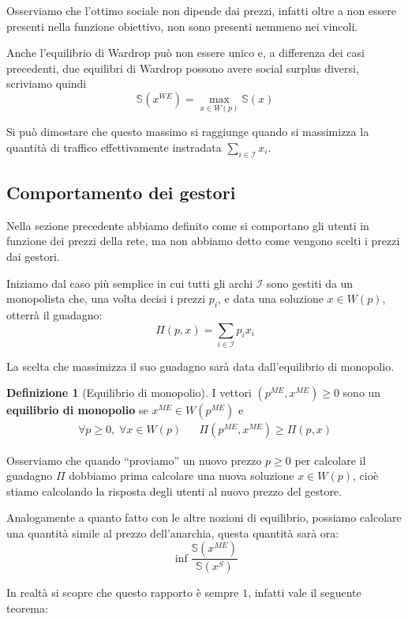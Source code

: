 \documentclass[a4paper]{article}
\theoremstyle{plain}
\theoremstyle{definition}
\newtheorem{mydef}[myteo]{Definizione}
\theoremstyle{remark}
\newcommand{\pa}[1]{\left(#1\right)}
\begin{document}
Osserviamo che l'ottimo sociale non dipende dai prezzi, infatti oltre
a non essere presenti nella funzione obiettivo, non sono presenti
nemmeno nei vincoli.

Anche l'equilibrio di Wardrop può non essere unico e, a differenza dei
casi precedenti, due equilibri di Wardrop possono avere social surplus
diversi, scriviamo quindi
\[ \mathbb{S}\pa{x^{WE}} = \max _{x\in W(p)} \mathbb{S}\pa{x} \]

Si può dimostare che questo massimo si raggiunge quando si massimizza
la quantità di traffico effettivamente instradata $\sum _{i\in
  \mathcal{I}} x_i$.

\subsection{Comportamento dei gestori}
\label{sec:prezzi-gestori}

Nella sezione precedente abbiamo definito come si comportano gli
utenti in funzione dei prezzi della rete, ma non abbiamo detto come
vengono scelti i prezzi dai gestori.

Iniziamo dal caso più semplice in cui tutti gli archi $\mathcal{I}$
sono gestiti da un monopolista che, una volta decisi i prezzi $p_i$, e
data una soluzione $x\in W(p)$, otterrà il guadagno:
\[ \Pi (p,x) = \sum _{i\in\mathcal{I}} p_i x_i \]

La scelta che massimizza il suo guadagno sarà data dall'equilibrio di
monopolio.
\begin{mydef}[Equilibrio di monopolio]
  I vettori $\pa{p^{ME},x^{ME}}\ge 0$ sono un \textbf{equilibrio di
    monopolio} se $x^{ME}\in W(p^{ME})$ e 
  \begin{align*}
    \forall p\ge 0,\; \forall x\in W(p) && \Pi \pa{p^{ME},x^{ME}}
                                           \ge \Pi \pa{p,x}
  \end{align*}
\end{mydef}

Osserviamo che quando ``proviamo'' un nuovo prezzo $p\ge 0$ per
calcolare il guadagno $\Pi$ dobbiamo prima calcolare una nuova
soluzione $x\in W\pa{p}$, cioè stiamo calcolando la risposta degli
utenti al nuovo prezzo del gestore.

Analogamente a quanto fatto con le altre nozioni di equilibrio,
possiamo calcolare una quantità simile al prezzo dell'anarchia, questa
quantità sarà ora:
\[ \inf \frac{\mathbb{S}\pa{x^{ME}}}{\mathbb{S}\pa{x^S}} \]

In realtà si scopre che questo rapporto è sempre $1$, infatti vale
il seguente teorema:
\end{document}
